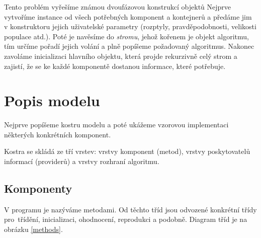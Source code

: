 Tento problém vyřešíme známou dvoufázovou konstrukcí objektů Nejprve vytvoříme instance od všech potřebných komponent a kontejnerů a předáme jim v konstruktoru jejich uživatelské parametry (rozptyly, pravděpodobnosti, velikosti populace atd.). Poté je navěsíme do \emph{stromu}, jehož kořenem je objekt algoritmu, tím určíme pořadí jejich volání a plně popíšeme požadovaný algoritmus. Nakonec zavoláme inicializaci hlavního objektu, která projde rekurzivně celý strom a zajistí, že se ke každé komponentě dostanou informace, které potřebuje.

\section{Popis modelu}

Nejprve popíšeme kostru modelu a poté ukážeme vzorovou implementaci některých konkrétních komponent.

Kostra se skládá ze tří vrstev: vrstvy komponent (metod), vrstvy poskytovatelů informací (providerů) a vrstvy rozhraní algoritmu.

\subsection{Komponenty}

V programu je nazýváme metodami. Od těchto tříd jsou odvozené konkrétní třídy pro~třídění, inicializaci, ohodnocení, reprodukci a podobně. Diagram tříd je na obrázku \ref{methods}.

